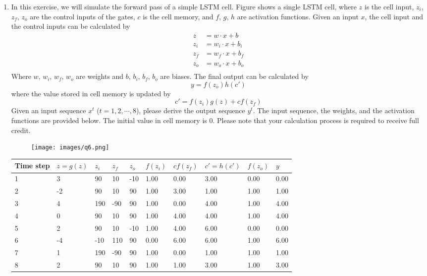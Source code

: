 \documentclass[12pt, a4paper]{article}
\begin{document}
\begin{enumerate}
\item In this exercise, we will simulate the forward pass of a simple LSTM cell. Figure shows a single LSTM cell, where $z$ is the cell input, $z_i$, $z_f$, $z_o$ are the control inputs of the gates, $c$ is the cell memory, and $f$, $g$, $h$ are activation functions. Given an input $x$, the cell input and the control inputs can be calculated by
\begin{align*}
    z &= w\cdot x+b\\
    z_i &= w_i\cdot x+b_i\\
    z_f &= w_f\cdot x+b_f\\
    z_o &= w_o\cdot x+b_o\\
\end{align*}
Where $w$, $w_i$, $w_f$, $w_o$ are weights and $b$, $b_i$, $b_f$, $b_o$ are biases. The final output can be calculated by
$$y = f(z_o)h(c')$$
where the value stored in cell memory is updated by
$$c' = f(z_i)g(z) + cf(z_f)$$
Given an input sequence $x^t$ ($t = 1, 2, \cdots, 8$), please derive the output sequence $y^t$. The input sequence, the weights, and the activation functions are provided below. The initial value in cell memory is $0$. Please note that your calculation process is required to receive full credit.
\begin{figure}[H]
    \centering
    \texttt{[image: images/q6.png]}
\end{figure}
\begin{tabular}{|l|p{1.8cm}|p{1cm}|p{1cm}|p{1cm}|p{1cm}|p{1cm}|p{1.8cm}|p{1cm}|p{1cm}|}\hline
    Time step & $z=g(z)$ & $z_i$ & $z_f$ & $z_o$ & $f(z_i)$ & $cf(z_f)$ & $c'=h(c')$ & $f(z_o)$ & $y$ \\ \hline
	1&3&90&10&-10&1.00&0.00&3.00&0.00&0.00\\ \hline
	2&-2&90&10&90&1.00&3.00&1.00&1.00&1.00\\ \hline
	3&4&190&-90&90&1.00&0.00&4.00&1.00&4.00\\ \hline
	4&0&90&10&90&1.00&4.00&4.00&1.00&4.00\\ \hline
	5&2&90&10&-10&1.00&4.00&6.00&0.00&0.00\\ \hline
	6&-4&-10&110&90&0.00&6.00&6.00&1.00&6.00\\ \hline
	7&1&190&-90&90&1.00&0.00&1.00&1.00&1.00\\ \hline
	8&2&90&10&90&1.00&1.00&3.00&1.00&3.00\\ \hline
\end{tabular}

\end{enumerate}
\end{document}
